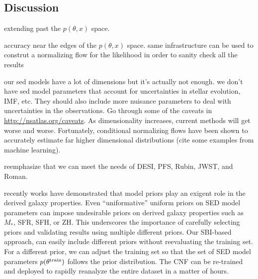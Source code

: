 \subsection{Discussion}  
extending past the $p(\theta, x)$ space.

accuracy near the edges of the $p(\theta, x)$ space. same infrastructure can be
used to construt a normalizing flow for the likelihood in order to sanity check
all the results 

our sed models have a lot of dimensions but it's actually not enough. 
we don't have sed model parameters that account for uncertainties in stellar
evolution, IMF, etc. 
They should also include more nuisance parameters to deal with uncertainties in
the observations. 
Go through some of the caveats in \url{http://nsatlas.org/caveats}. 
As dimensionality increases, current methods will get worse and worse. 
Fortunately, conditional normalizing flows have been shown to accurately
estimate far higher dimensional distributions (cite some examples from machine
learning). 

reemphasize that we can meet the needs of DESI, PFS, Rubin, JWST, and Roman. 

recently works have demonstrated that model priors play an exigent role in the
derived galaxy properties. 
Even ``uniformative'' uniform priors on SED model parameters can impose
undesirable priors on derived galaxy properties such as $M_*$, SFR, SFH, or
ZH.
This underscores the importance of carefully selecting priors and validating
results using multiple different priors. 
Our SBI-based approach, can easily include different priors without
reevaluating the training set.
For a different prior, we can adjust the training set so that the set of SED
model parameters $p(\theta^{\rm train})$ follows the prior distribution. 
The CNF can be re-trained and deployed to rapidly reanalyze the entire dataset
in a matter of hours. 



